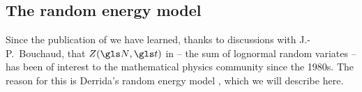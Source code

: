 %

\subsection{The random energy model}
Since the publication of \cite{PetersKlein2013} we have learned, thanks to discussions with J.-P.~Bouchaud, that $Z(\N,\t)$ in  -- the sum of lognormal random variates -- has been of interest to the mathematical physics community since the 1980s. The reason for this is Derrida's random energy model \cite{Derrida1980,Derrida1981}, which we will describe here.

